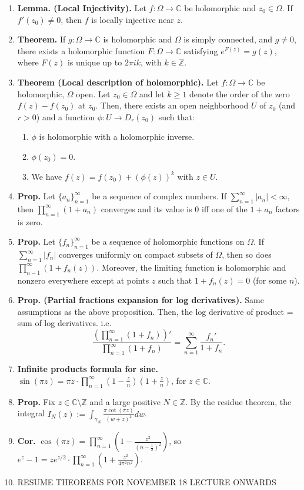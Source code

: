 \documentclass[11pt]{article}
\theoremstyle{definition}
\theoremstyle{named}
\begin{document}
\begin{enumerate}
    \item \textbf{Lemma. (Local Injectivity). } Let $f: \Omega \to \mathbb{C}$ be holomorphic and $z_0 \in \Omega$. If $f'(z_0) \neq 0$, then $f$ is locally injective near $z$. 
    \item \textbf{Theorem. } If $g: \Omega \to \mathbb{C}$ is holomorphic and $\Omega$ is simply connected, and $g \neq 0$, there exists a holomorphic function $F: \Omega \to \mathbb{C}$ satisfying $e^{F(z)} = g(z)$, where $F(z)$ is unique up to $2\pi ik$, with $k \in \mathbb{Z}$. 
    \item \textbf{Theorem (Local description of holomorphic). } Let $f: \Omega \to \mathbb{C}$ be holomorphic, $\Omega$ open. Let $z_0 \in \Omega$ and let $k \geq 1$ denote the order of the zero $f(z) - f(z_0)$ at $z_0$. Then, there exists an open neighborhood $U$ of $z_0$ (and $r>0$) and a function $\phi: U \to D_r(z_0)$ such that: 
    \begin{enumerate}
        \item $\phi$ is holomorphic with a holomorphic inverse. 
        \item $\phi(z_0) = 0$. 
        \item We have $f(z) = f(z_0) + (\phi(z))^k$ with $z \in U$. 
    \end{enumerate}
    \item \textbf{Prop. } Let $\{a_n\}_{n=1}^{\infty}$ be a sequence of complex numbers. If $\sum_{n=1}^{\infty}|a_n| < \infty$, then $\prod_{n=1}^{\infty}(1+a_n)$ converges and its value is 0 iff one of the $1+a_n$ factors is zero. 
    \item \textbf{Prop. } Let $\{f_n\}_{n=1}^{\infty}$ be a sequence of holomorphic functions on $\Omega$. If $\sum_{n=1}^{\infty}|f_n|$ converges uniformly on compact subsets of $\Omega$, then so does $\prod_{n-1}^{\infty}(1 + f_n(z))$. Moreover, the limiting function is holomorphic and nonzero everywhere except at points $z$ such that $1 + f_n(z) = 0$ (for some $n$). 
    \item \textbf{Prop. (Partial fractions expansion for log derivatives). } Same assumptions as the above proposition. Then, the log derivative of product = sum of log derivatives. i.e. 
    $$
    \frac{\left(\prod_{n=1}^{\infty}(1+f_n)\right)'}{\prod_{n=1}^{\infty}(1+f_n)} = \sum_{n=1}^{\infty} \frac{f_n'}{1 + f_n}. 
    $$
    \item \textbf{Infinite products formula for sine. } $\sin(\pi z) = \pi z \cdot \prod_{n=1}^{\infty}(1 - \frac{z}{n})(1 + \frac{z}{n})$, for $z \in \mathbb{C}$. 
    \item \textbf{Prop. } Fix $z \in \mathbb{C} \setminus \mathbb{Z}$ and a large positive $N \in \mathbb{Z}$. By the residue theorem, the integral $I_N(z) := \int_{\gamma_N} \frac{\pi\cot(\pi z)}{(w+z)^2} dw$. 
    \item \textbf{Cor. } $\cos(\pi z) = \prod_{n=1}^{\infty} \left(1 - \frac{z^2}{\left(n - \frac{1}{2}\right)^2}\right)$, so $e^z - 1 = ze^{z/2} \cdot \prod_{n=1}^{\infty} \left(1 + \frac{z^2}{4\pi^2n^2}\right)$. 
    \item RESUME THEOREMS FOR NOVEMBER 18 LECTURE ONWARDS
\end{enumerate}
\end{document}
